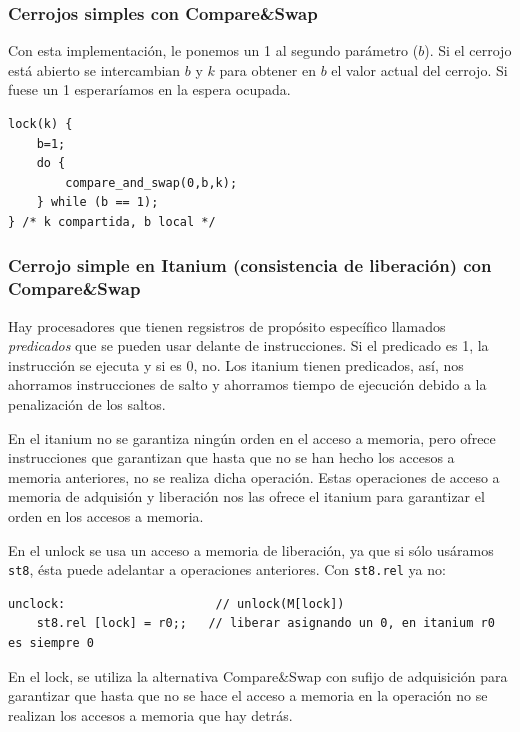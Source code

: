 \documentclass[10pt,a4paper,spanish]{report}
\begin{document}
\textcolor{azul}{\subsubsection{Cerrojos simples con Compare\&Swap}}
Con esta implementación, le ponemos un 1 al segundo parámetro ($b$). Si el cerrojo está abierto se intercambian $b$ y $k$ para obtener en $b$ el valor actual del cerrojo. Si fuese un 1 esperaríamos en la espera ocupada.

\begin{verbatim}
lock(k) {
    b=1;
    do {
        compare_and_swap(0,b,k);
    } while (b == 1);
} /* k compartida, b local */
\end{verbatim}

\textcolor{azul}{\subsubsection{Cerrojo simple en Itanium (consistencia de liberación) con Compare\&Swap}}
Hay procesadores que tienen regsistros de propósito específico llamados \textcolor{azul}{\textit{predicados}} que se pueden usar delante de instrucciones. Si el predicado es 1, la instrucción se ejecuta y si es 0, no. Los itanium tienen predicados, así, nos ahorramos instrucciones de salto y ahorramos tiempo de ejecución debido a la penalización de los saltos.

En el itanium no se garantiza ningún orden en el acceso a memoria, pero ofrece instrucciones que garantizan que hasta que no se han hecho los accesos a memoria anteriores, no se realiza dicha operación. Estas operaciones de acceso a memoria de adquisión y liberación nos las ofrece el itanium para garantizar el orden en los accesos a memoria.

En el unlock se usa un acceso a memoria de liberación, ya que si sólo usáramos \verb*|st8|, ésta puede adelantar a operaciones anteriores. Con \verb*|st8.rel| ya no:

\begin{verbatim}
unclock:                     // unlock(M[lock])
    st8.rel [lock] = r0;;   // liberar asignando un 0, en itanium r0 es siempre 0
\end{verbatim}

En el lock, se utiliza la alternativa Compare\&Swap con sufijo de adquisición para garantizar que hasta que no se hace el acceso a memoria en la operación no se realizan los accesos a memoria que hay detrás.
\end{document}
